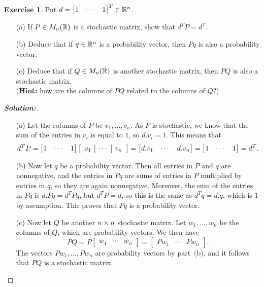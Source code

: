 \documentclass[a4paper]{amsart}
\theoremstyle{definition}
\newtheorem{exercise}{Exercise}
\newenvironment{solution}{\begin{proof}[\textbf{Solution:}] \vphantom{u}}{\end{proof}}
\begin{document}
\begin{exercise}\label{ex-stochastic-i}
 Put $d=\left[\begin{matrix} 1 &\cdots&1\end{matrix}\right]^T\in{\mathbb{R}}^n$.
 \begin{itemize}
  \item[(a)] If $P\in M_n({\mathbb{R}})$ is a stochastic matrix, show that $d^TP=d^T$.
  \item[(b)] Deduce that if $q\in{\mathbb{R}}^n$ is a probability vector, then
   $Pq$ is also a probability vector.
  \item[(c)] Deduce that if $Q\in M_n({\mathbb{R}})$ is another stochastic
   matrix, then $PQ$ is also a stochastic matrix.\\
   (\textbf{Hint:} how are the columns of $PQ$ related to the columns
   of $Q$?)
 \end{itemize}
\end{exercise}
\begin{solution}
 \begin{itemize}
  \item[(a)] Let the columns of $P$ be $v_1,\dotsc,v_n$.  As $P$ is
   stochastic, we know that the sum of the entries in $v_i$  is equal
   to $1$, so $d.v_i=1$.  This means that
   \[ d^TP =
      \left[\begin{matrix} 1 &\cdots& 1\end{matrix}\right] 
       \left[\begin{array}{c|c|c} 
       v_1 & \cdots & v_n 
      \end{array}\right] = 
      \left[\begin{matrix} d.v_1 & \cdots & d.v_n \end{matrix}\right] = 
      \left[\begin{matrix} 1 & \cdots & 1 \end{matrix}\right] = d^T.
   \]
  \item[(b)] Now let $q$ be a probability vector.  Then all entries in
   $P$ and $q$ are nonnegative, and the entries in $Pq$ are sums of
   entries in $P$ multiplied by entries in $q$, so they are again
   nonnegative.  Moreover, the sum of the entries in $Pq$ is
   $d.Pq=d^TPq$, but $d^TP=d$, so this is the same as $d^Tq=d.q$,
   which is $1$ by assumption.  This proves that $Pq$ is a probability
   vector.
  \item[(c)] Now let $Q$ be another $n\times n$ stochastic matrix.  Let
   $w_1,\dotsc,w_n$ be the columns of $Q$, which are probability
   vectors.  We then have
   \[ PQ 
       = P \left[\begin{array}{c|c|c} 
            w_1 & \cdots & w_n 
           \end{array}\right] 
       =  \left[\begin{array}{c|c|c} 
            Pw_1 & \cdots & Pw_n 
           \end{array}\right].
   \]
   The vectors $Pw_1,\dotsc,Pw_n$ are probability vectors by part~(b),
   and it follows that $PQ$ is a stochastic matrix.
 \end{itemize}
\end{solution}
\end{document}
